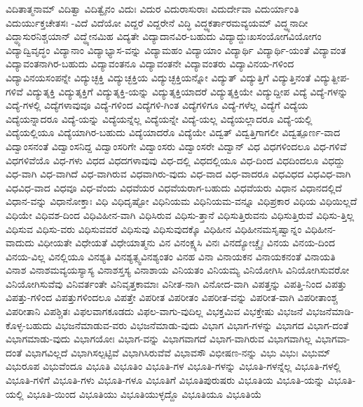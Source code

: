 {ವಿದಿತಾತ್ಮನಾಮ್
ವಿದಿತ್ವಾ
ವಿದಿತ್ವೈನಂ
ವಿದುಃ
ವಿದುರ
ವಿದುರಾಸುರಾಃ
ವಿದುರ್ದೇವಾ
ವಿದುರ್ಯಾಂತಿ
ವಿದುರ್ಯುಕ್ತಚೇತಸಃ
-ವಿದೆ
ವಿದೆಯೋ
ವಿದ್ದರೆ
ವಿದ್ದರೇನೆ
ವಿದ್ಧಿ
ವಿದ್ಧ್ಯಕರ್ತಾರಮವ್ಯಯಮ್
ವಿದ್ಧ್ಯನಾದೀ
ವಿದ್ಧ್ಯಾಸುರನಿಶ್ಚಯಾನ್
ವಿದ್ಧ್ಯೇನಮಿಹ
ವಿದ್ಯತೇ
ವಿದ್ಯಾದಾನವಿರ-ಬಹುದು
ವಿದ್ಯಾದ್ದುಃಖಸಂಯೋಗವಿಯೋಗಂ
ವಿದ್ಯಾದ್ವಿವೃದ್ಧಂ
ವಿದ್ಯಾನಾಂ
ವಿದ್ಯಾಭ್ಯಾಸ-ವನ್ನು
ವಿದ್ಯಾಮಹಂ
ವಿದ್ಯಾಯಾಂ
ವಿದ್ಯಾರ್ಥಿ
ವಿದ್ಯಾರ್ಥಿ-ಯಂತೆ
ವಿದ್ಯಾವಂತ
ವಿದ್ಯಾವಂತನಾಗಿರ-ಬಹುದು
ವಿದ್ಯಾವಂತನೂ
ವಿದ್ಯಾವಂತನೇ
ವಿದ್ಯಾವಂತರು
ವಿದ್ಯಾವಿನಯ-ಗಳಿಂದ
ವಿದ್ಯಾವಿನಯಸಂಪನ್ನೇ
ವಿದ್ಯುಚ್ಛಕ್ತಿ
ವಿದ್ಯುಚ್ಛಕ್ತಿಯ
ವಿದ್ಯುಚ್ಛಕ್ತಿಯನ್ನೋ
ವಿದ್ಯುತ್
ವಿದ್ಯುತ್ತಿಗೆ
ವಿದ್ಯುತ್ತಿನಂತೆ
ವಿದ್ಯುತ್ದೀಪ-ಗಳಿವೆ
ವಿದ್ಯುತ್ಶಕ್ತಿ
ವಿದ್ಯುತ್ಶಕ್ತಿಗೆ
ವಿದ್ಯುತ್ಶಕ್ತಿ-ಯನ್ನು
ವಿದ್ಯುತ್ಶಕ್ತಿಯಾದರೆ
ವಿದ್ಯುತ್ಶಕ್ತಿಯೇ
ವಿದ್ಯುದ್ದೀಪ
ವಿದ್ಯೆ
ವಿದ್ಯೆ-ಗಳನ್ನು
ವಿದ್ಯೆ-ಗಳಲ್ಲಿ
ವಿದ್ಯೆಗಳಾವುವೂ
ವಿದ್ಯೆ-ಗಳಿಂದ
ವಿದ್ಯೆಗಳಿ-ಗಿಂತ
ವಿದ್ಯೆಗಳಿಗೂ
ವಿದ್ಯೆ-ಗಳೆಲ್ಲ
ವಿದ್ಯೆಗೆ
ವಿದ್ಯೆಯ
ವಿದ್ಯೆಯನ್ನಾದರೂ
ವಿದ್ಯೆ-ಯನ್ನು
ವಿದ್ಯೆಯನ್ನೆಲ್ಲ
ವಿದ್ಯೆಯನ್ನೇ
ವಿದ್ಯೆ-ಯಲ್ಲ
ವಿದ್ಯೆಯಲ್ಲಾದರೂ
ವಿದ್ಯೆ-ಯಲ್ಲಿ
ವಿದ್ಯೆಯಲ್ಲಿಯೂ
ವಿದ್ಯೆಯಾಗಿರ-ಬಹುದು
ವಿದ್ಯೆಯಾದರೊ
ವಿದ್ಯೆಯೇ
ವಿದ್ವತ್
ವಿದ್ವತ್ತಿಗಾಗಲೀ
ವಿದ್ವತ್ಪೂರ್ಣ-ವಾದ
ವಿದ್ವಾಂಸನಂತೆ
ವಿದ್ವಾಂಸನಿದ್ದ
ವಿದ್ವಾಂಸರಿಗೇ
ವಿದ್ವಾಂಸರು
ವಿದ್ವಾಂಸರೇ
ವಿದ್ವಾನ್
ವಿಧ
ವಿಧಗಳಿಂದಲೂ
ವಿಧ-ಗಳಿವೆ
ವಿಧಗಳಿವೆಯೊ
ವಿಧ-ಗಳು
ವಿಧದ
ವಿಧದಗಳಾವುವು
ವಿಧ-ದಲ್ಲಿ
ವಿಧದಲ್ಲಿಯೂ
ವಿಧ-ದಿಂದ
ವಿಧದಿಂದಲೂ
ವಿಧದ್ದು
ವಿಧ-ವಾಗಿ
ವಿಧ-ವಾಗಿದೆ
ವಿಧ-ವಾಗಿರುವ
ವಿಧವಾಗಿರು-ವುದು
ವಿಧ-ವಾದ
ವಿಧ-ವಾದರೂ
ವಿಧವಿಧದ
ವಿಧವಿಧ-ವಾಗಿ
ವಿಧವಿಧ-ವಾದ
ವಿಧವೂ
ವಿಧ-ವೆಂದು
ವಿಧವೆಯರ
ವಿಧವೆಯರಾಗ-ಬಹುದು
ವಿಧವೆಯರು
ವಿಧಾನ
ವಿಧಾನದಲ್ಲಿದೆ
ವಿಧಾನ-ವನ್ನು
ವಿಧಾನೋಕ್ತಾಃ
ವಿಧಿ
ವಿಧಿದೃಷ್ಟೋ
ವಿಧಿನಿಯಮ
ವಿಧಿನಿಯಮ-ವನ್ನೂ
ವಿಧಿಪ್ರಕಾರ
ವಿಧಿಯ
ವಿಧಿಯಿಲ್ಲದೆ
ವಿಧಿಯೇ
ವಿಧಿವಶ-ದಿಂದ
ವಿಧಿವಿಹೀನ-ವಾಗಿ
ವಿಧಿಸಿರುವ
ವಿಧಿಸು-ತ್ತಾನೆ
ವಿಧಿಸುತ್ತಿರುವನು
ವಿಧಿಸುತ್ತಿರುವೆ
ವಿಧಿಸು-ತ್ತಿಲ್ಲ
ವಿಧಿಸುವ
ವಿಧಿಸು-ವರು
ವಿಧಿಸುವವರೆ
ವಿಧಿಸುವು
ವಿಧಿಸುವುದಕ್ಕೊ
ವಿಧಿಹೀನ
ವಿಧಿಹೀನಮಸೃಷ್ವಾನ್ನಂ
ವಿಧಿಹೀನ-ವಾದುದು
ವಿಧೀಯತೇ
ವಿಧೇಯತೆ
ವಿಧೇಯಾತ್ಮನು
ವಿನ
ವಿನಂಕ್ಷ್ಯಸಿ
ವಿನಃ
ವಿನದ್ಯೋಚ್ಚೈಃ
ವಿನಯ
ವಿನಯ-ದಿಂದ
ವಿನಯ-ವಿಲ್ಲ
ವಿನಲ್ಲಿಯೂ
ವಿನಶ್ಯತಿ
ವಿನಶ್ಯತ್ಸ್ವವಿನಶ್ಯಂತಂ
ವಿನಹ
ವಿನಾ
ವಿನಾಯಕನ
ವಿನಾಯಕನಂತೆ
ವಿನಾಯತಿ
ವಿನಾಶ
ವಿನಾಶಮವ್ಯಯಸ್ಯಾಸ್ಯ
ವಿನಾಶಸ್ತಸ್ಯ
ವಿನಾಶಾಯ
ವಿನಿಯತಂ
ವಿನಿಯಮ್ಯ
ವಿನಿಯೋಗಿಸಿ
ವಿನಿಯೋಗಿಸುವರೋ
ವಿನಿಯೋಗಿಸುವೆವು
ವಿನಿವರ್ತಂತೇ
ವಿನಿವೃತ್ತಕಾಮಾಃ
ವಿನೀತ-ನಾಗಿ
ವಿನೋದ-ವಾಗಿ
ವಿಪತ್ತನ್ನು
ವಿಪತ್ತಿ-ನಿಂದ
ವಿಪತ್ತು
ವಿಪತ್ತು-ಗಳಿಂದ
ವಿಪತ್ತುಗಳಿಂದಲೂ
ವಿಪತ್ತೇ
ವಿಪರೀತ
ವಿಪರೀತಂ
ವಿಪರೀತ-ವನ್ನು
ವಿಪರೀತ-ವಾಗಿ
ವಿಪರೀತಾಂಶ್ಚ
ವಿಪರೀತಾನಿ
ವಿಪಶ್ಚಿತಃ
ವಿಫಲವಾಗಕೂಡದು
ವಿಫಲ-ವಾಗು-ವುದಿಲ್ಲ
ವಿಭಕ್ತಮಿವ
ವಿಭಕ್ತೇಷು
ವಿಭಜನೆ
ವಿಭಜನೆಮಾಡಿ-ಕೊಳ್ಳ-ಬಹುದು
ವಿಭಜನೆಮಾಡುವ-ವರು
ವಿಭಜನೆಮಾಡು-ವುದು
ವಿಭಾಗ
ವಿಭಾಗ-ಗಳನ್ನು
ವಿಭಾಗದ
ವಿಭಾಗ-ದಂತೆ
ವಿಭಾಗಮಾಡು-ವುದು
ವಿಭಾಗಯೋಃ
ವಿಭಾಗ-ವನ್ನು
ವಿಭಾಗವಾಗದೆ
ವಿಭಾಗ-ವಾಗಿರುವ
ವಿಭಾಗವಾಗಿಲ್ಲ
ವಿಭಾಗವಾ-ದಂತೆ
ವಿಭಾಗವಿಲ್ಲದೆ
ವಿಭಾಗಿಸಲ್ಪಟ್ಟಿವೆ
ವಿಭಾಗಿಸಿರುವೆವೆ
ವಿಭಾವಸೌ
ವಿಭೀಷಣ-ನನ್ನು
ವಿಭು
ವಿಭುಃ
ವಿಭುಮ್
ವಿಭುರೂಪ
ವಿಭುವೆಂದೂ
ವಿಭೂತಿ
ವಿಭೂತಿಂ
ವಿಭೂತಿ-ಗಳ
ವಿಭೂತಿ-ಗಳನ್ನು
ವಿಭೂತಿ-ಗಳನ್ನೆಲ್ಲ
ವಿಭೂತಿ-ಗಳಲ್ಲಿ
ವಿಭೂತಿ-ಗಳಿಗೆ
ವಿಭೂತಿ-ಗಳು
ವಿಭೂತಿ-ಗಳೂ
ವಿಭೂತಿಗೆ
ವಿಭೂತಿಪುರುಷರು
ವಿಭೂತಿಯ
ವಿಭೂತಿ-ಯನ್ನು
ವಿಭೂತಿ-ಯಲ್ಲಿ
ವಿಭೂತಿ-ಯಿಂದ
ವಿಭೂತಿಯು
ವಿಭೂತಿಯುಳ್ಳದ್ದೊ
ವಿಭೂತಿಯೂ
ವಿಭೂತಿಯೆ
}
